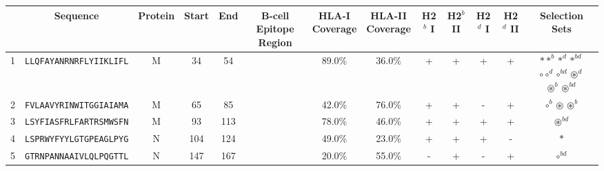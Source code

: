 \begin{tabular}{rcccccccccccc}
\toprule
{} &                        Sequence & Protein &  Start &   End &                                            B-cell Epitope Region & \Centerstack{HLA-I \\ Coverage} & \Centerstack{HLA-II \\ Coverage} & H2$^{b}$ I & H2$^{b}$ II & H2$^{d}$ I & H2$^{d}$ II &                                                                                                                                              Selection Sets \\
\midrule
1  &  \texttt{LLQFAYANRNRFLYIIKLIFL} &       M &     34 &    54 &                                                                  &                          89.0\% &                           36.0\% &          + &           + &          + &           + &                           \Centerstack{  $\ast \ast^b \ast^d \ast^{bd}$ \\  $\circ \circ^d \circ^{bd} \circledast^d$ \\  $\circledast^b \circledast^{bd}$ } \\
2  &  \texttt{FVLAAVYRINWITGGIAIAMA} &       M &     65 &    85 &                                                                  &                          42.0\% &                           76.0\% &          + &           + &          - &           + &                                                                                                                       $ \circ^b \circledast \circledast^b $ \\
3  &  \texttt{LSYFIASFRLFARTRSMWSFN} &       M &     93 &   113 &                                                                  &                          78.0\% &                           46.0\% &          + &           + &          + &           + &                                                                                                                                        $ \circledast^{bd} $ \\
4  &  \texttt{LSPRWYFYYLGTGPEAGLPYG} &       N &    104 &   124 &                                                                  &                          49.0\% &                           23.0\% &          + &           + &          + &           - &                                                                                                                                                    $ \ast $ \\
5  &  \texttt{GTRNPANNAAIVLQLPQGTTL} &       N &    147 &   167 &                                                                  &                          20.0\% &                           55.0\% &          - &           + &          - &           + &                                                                                                                                              $ \circ^{bd} $ \\

\end{tabular}
